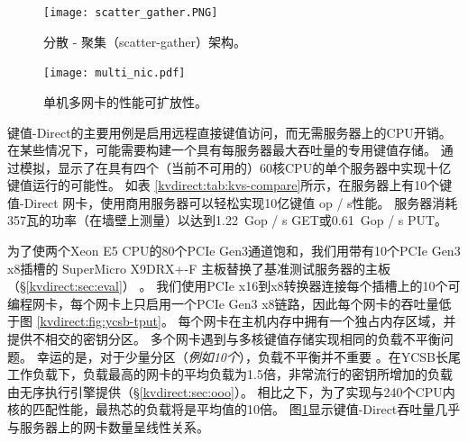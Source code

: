 \begin{figure}[t]
\begin{minipage}[t]{0.5\textwidth}
\centering
\texttt{[image: scatter\_gather.PNG]}
\caption{分散 - 聚集（scatter-gather）架构。}
\label{kvdirect:fig:sg-arch}
\end{minipage}
\begin{minipage}[t]{0.5\textwidth}
\centering
\texttt{[image: multi\_nic.pdf]}
\caption{单机多网卡的性能可扩放性。}
\label{kvdirect:fig:multiple-nics}
\end{minipage}

\end{figure}

键值-Direct的主要用例是启用远程直接键值访问，而无需服务器上的CPU开销。
在某些情况下，可能需要构建一个具有每服务器最大吞吐量的专用键值存储。
通过模拟，\cite {li2016full}显示了在具有四个（当前不可用的）60核CPU的单个服务器中实现十亿键值运行的可能性。
如表 \ref{kvdirect:tab:kvs-compare}所示，在服务器上有10个键值-Direct 网卡，使用商用服务器可以轻松实现10亿键值 op / s性能。
服务器消耗357瓦的功率（在墙壁上测量）以达到1.22~Gop / s GET或0.61~Gop / s PUT。

为了使两个Xeon E5 CPU的80个PCIe Gen3通道饱和，我们用带有10个PCIe Gen3 x8插槽的 SuperMicro X9DRX+-F 主板替换了基准测试服务器的主板（\S\ref {kvdirect:sec:eval}） 。
我们使用PCIe x16到x8转换器连接每个插槽上的10个可编程网卡，每个网卡上只启用一个PCIe Gen3 x8链路，因此每个网卡的吞吐量低于图 \ref {kvdirect:fig:ycsb-tput}。
每个网卡在主机内存中拥有一个独占内存区域，并提供不相交的密钥分区。
多个网卡遇到与多核键值存储实现相同的负载不平衡问题。
幸运的是，对于少量分区（\textit {例如10个}），负载不平衡并不重要 \cite {lim2014mica,li2016full}。在YCSB长尾工作负载下，负载最高的网卡的平均负载为1.5倍，非常流行的密钥所增加的负载由无序执行引擎提供（\S \ref {kvdirect:sec:ooo}）。
相比之下，为了实现与240个CPU内核的匹配性能，最热芯的负载将是平均值的10倍。
图\ref {kvdirect:fig:multiple-nics}显示键值-Direct吞吐量几乎与服务器上的网卡数量呈线性关系。

